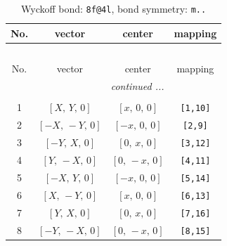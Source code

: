 \documentclass[fleqn,8pt]{jsarticle}
\begin{document}
\begin{longtable}{cccc}
\caption{Wyckoff bond: {\tt 8f@4l}, bond symmetry: {\tt m..}}
 \\
 \hline \hline
No. & vector & center & mapping \\ \hline \endfirsthead

\multicolumn{3}{l}{\tablename\ \thetable{}} \\
 \hline \hline
No. & vector & center & mapping \\ \hline \endhead

 \hline \hline
\multicolumn{3}{r}{\footnotesize\it continued ...} \\ \endfoot

 \hline \hline
\multicolumn{3}{r}{} \\ \endlastfoot

1 & $\left[ X,\, Y,\, 0 \right]$ & $\left[ x,\, 0,\, 0 \right]$ & {\tt [1,10]} \\ \hline
2 & $\left[ - X,\, - Y,\, 0 \right]$ & $\left[ - x,\, 0,\, 0 \right]$ & {\tt [2,9]} \\ \hline
3 & $\left[ - Y,\, X,\, 0 \right]$ & $\left[ 0,\, x,\, 0 \right]$ & {\tt [3,12]} \\ \hline
4 & $\left[ Y,\, - X,\, 0 \right]$ & $\left[ 0,\, - x,\, 0 \right]$ & {\tt [4,11]} \\ \hline
5 & $\left[ - X,\, Y,\, 0 \right]$ & $\left[ - x,\, 0,\, 0 \right]$ & {\tt [5,14]} \\ \hline
6 & $\left[ X,\, - Y,\, 0 \right]$ & $\left[ x,\, 0,\, 0 \right]$ & {\tt [6,13]} \\ \hline
7 & $\left[ Y,\, X,\, 0 \right]$ & $\left[ 0,\, x,\, 0 \right]$ & {\tt [7,16]} \\ \hline
8 & $\left[ - Y,\, - X,\, 0 \right]$ & $\left[ 0,\, - x,\, 0 \right]$ & {\tt [8,15]} \\
\end{longtable}
\renewcommand{\arraystretch}{1.2}
\end{document}
